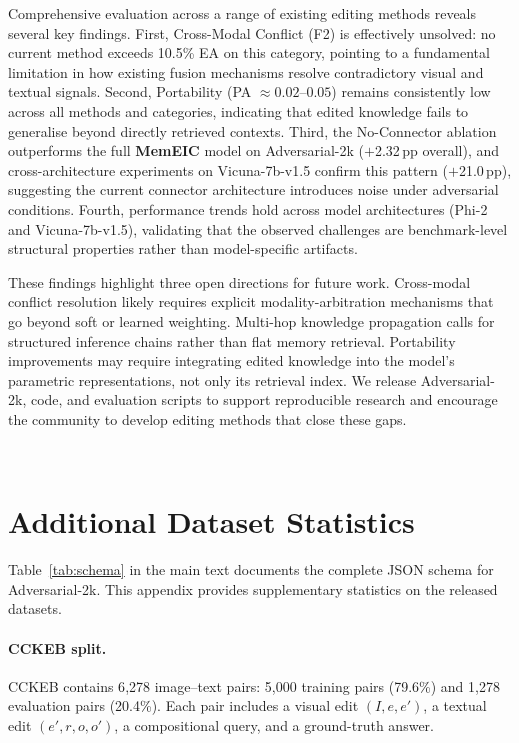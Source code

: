\documentclass{article}
\newcommand{\memeic}{\textbf{MemEIC}}
\begin{document}
Comprehensive evaluation across a range of existing editing methods reveals several key findings. First, Cross-Modal Conflict (F2) is effectively unsolved: no current method exceeds 10.5\% EA on this category, pointing to a fundamental limitation in how existing fusion mechanisms resolve contradictory visual and textual signals. Second, Portability (PA $\approx 0.02$--$0.05$) remains consistently low across all methods and categories, indicating that edited knowledge fails to generalise beyond directly retrieved contexts. Third, the No-Connector ablation outperforms the full \memeic{} model on Adversarial-2k ($+$2.32\,pp overall), and cross-architecture experiments on Vicuna-7b-v1.5 confirm this pattern ($+$21.0\,pp), suggesting the current connector architecture introduces noise under adversarial conditions. Fourth, performance trends hold across model architectures (Phi-2 and Vicuna-7b-v1.5), validating that the observed challenges are benchmark-level structural properties rather than model-specific artifacts.

These findings highlight three open directions for future work. Cross-modal conflict resolution likely requires explicit modality-arbitration mechanisms that go beyond soft or learned weighting. Multi-hop knowledge propagation calls for structured inference chains rather than flat memory retrieval. Portability improvements may require integrating edited knowledge into the model's parametric representations, not only its retrieval index. We release Adversarial-2k, code, and evaluation scripts to support reproducible research and encourage the community to develop editing methods that close these gaps.


\


\appendix



\section{Additional Dataset Statistics}
\label{app:stats}

Table~\ref{tab:schema} in the main text documents the complete JSON schema for Adversarial-2k. This appendix provides supplementary statistics on the released datasets.

\paragraph{CCKEB split.}
CCKEB contains 6{,}278 image--text pairs: 5{,}000 training pairs (79.6\%) and 1{,}278 evaluation pairs (20.4\%). Each pair includes a visual edit $(I, e, e')$, a textual edit $(e', r, o, o')$, a compositional query, and a ground-truth answer.
\end{document}
